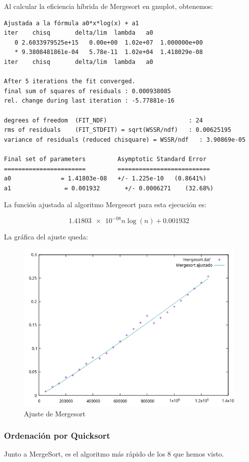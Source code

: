 \documentclass[12pt, spanish]{article}
\begin{document}
Al calcular la eficiencia híbrida de Mergesort en gnuplot, obtenemos:
\begin{verbatim}
Ajustada a la fórmula a0*x*log(x) + a1
iter  	chisq   	delta/lim  lambda   a0
   0 2.6033979525e+15   0.00e+00  1.02e+07	1.000000e+00
   * 9.3808481861e-04   5.78e-11  1.02e+04	1.418029e-08
iter  	chisq   	delta/lim  lambda   a0

After 5 iterations the fit converged.
final sum of squares of residuals : 0.000938085
rel. change during last iteration : -5.77881e-16

degrees of freedom	(FIT_NDF)                       : 24
rms of residuals  	(FIT_STDFIT) = sqrt(WSSR/ndf)   : 0.00625195
variance of residuals (reduced chisquare) = WSSR/ndf   : 3.90869e-05

Final set of parameters        	Asymptotic Standard Error
=======================        	==========================
a0          	= 1.41803e-08  	+/- 1.225e-10	(0.8641%)
a1               = 0.001932       +/- 0.0006271    (32.68%)
\end{verbatim}

La función ajustada al algoritmo Mergesort para esta ejecución es:

\[\num{1.41803e-08}n\log(n) + 0.001932\]

La gráfica del ajuste queda:
\begin{figure}[H]
  \centering
  \includegraphics[scale = 1]{AjusteMergesort.png}
  \caption{Ajuste de Mergesort}
\end{figure}


\subsubsection{Ordenación por Quicksort}
Junto a MergeSort, es el algoritmo más rápido de los 8 que hemos visto.
\end{document}
